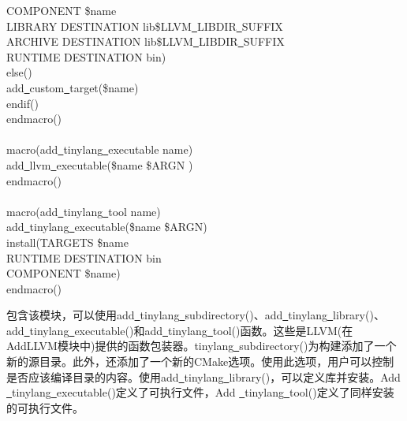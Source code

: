 \begin{tcolorbox}[colback=white,colframe=black]
\hspace*{1.5cm}COMPONENT \${name} \\
\hspace*{1.5cm}LIBRARY DESTINATION lib\${LLVM\underline{~}LIBDIR\underline{~}SUFFIX} \\
\hspace*{1.5cm}ARCHIVE DESTINATION lib\${LLVM\underline{~}LIBDIR\underline{~}SUFFIX} \\
\hspace*{1.5cm}RUNTIME DESTINATION bin) \\
\hspace*{0.5cm}else() \\
\hspace*{1cm}add\underline{~}custom\underline{~}target(\${name}) \\
\hspace*{0.5cm}endif() \\
endmacro() \\
 \\
macro(add\underline{~}tinylang\underline{~}executable name) \\
\hspace*{0.5cm}add\underline{~}llvm\underline{~}executable(\${name} \${ARGN} ) \\
endmacro() \\
 \\
macro(add\underline{~}tinylang\underline{~}tool name) \\
\hspace*{0.5cm}add\underline{~}tinylang\underline{~}executable(\${name} \${ARGN}) \\
\hspace*{0.5cm}install(TARGETS \${name} \\
\hspace*{1cm}RUNTIME DESTINATION bin \\
\hspace*{1cm}COMPONENT \${name}) \\
endmacro()
\end{tcolorbox}

包含该模块，可以使用add\underline{~}tinylang\underline{~}subdirectory()、add\underline{~}tinylang\underline{~}library()、add\underline{~}tinylang\underline{~}executable()和add\underline{~}tinylang\underline{~}tool()函数。这些是LLVM(在AddLLVM模块中)提供的函数包装器。tinylang\underline{~}subdirectory()为构建添加了一个新的源目录。此外，还添加了一个新的CMake选项。使用此选项，用户可以控制是否应该编译目录的内容。使用add\underline{~}tinylang\underline{~}library()，可以定义库并安装。Add \underline{~}tinylang\underline{~}executable()定义了可执行文件，Add \underline{~}tinylang\underline{~}tool()定义了同样安装的可执行文件。\par

